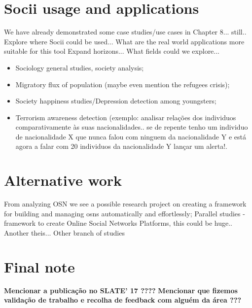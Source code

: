 \section{Socii usage and applications}
We have already demonstrated some case studies/use cases in Chapter 8... still..
Explore where Socii could be used... What are the real world applications more suitable for this tool
Expand horizons... What fields could we explore...\\
\begin{itemize}
    \item Sociology general studies, society analysis;
    \item Migratory flux of population (maybe even mention the refugees crisis);
    \item Society happiness studies/Depression detection among youngsters;
    \item Terrorism awareness detection (exemplo: analisar relações dos individuos comparativamente às suas nacionalidades.. se
    de repente tenho um individuo de nacionalidade X que nunca falou com ninguem da nacionalidade Y e está agora a falar com 20 individuos da nacionalidade Y lançar um alerta!.
\end{itemize}

\section{Alternative work}
From analyzing OSN we see a possible research project on creating a framework for building
and managing \glspl{osn} automatically and effortlessly;
Parallel studies - framework to create Online Social Networks Platforms, this could be huge.. Another theis... Other branch of studies

\section{Final note}
\textbf{Mencionar a publicação no SLATE' 17 ????}
\textbf{Mencionar que fizemos validação de trabalho e recolha de feedback com alguém da área ???}

